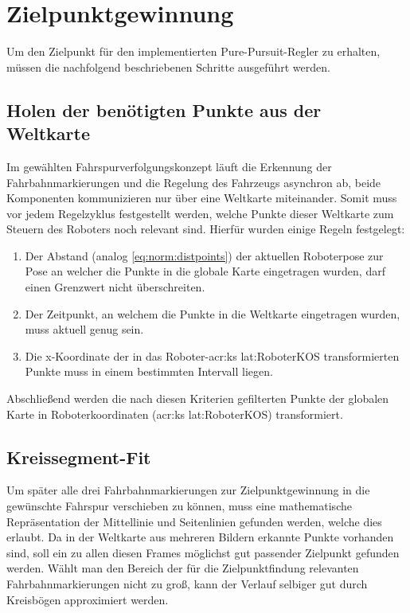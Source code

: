 \section{Zielpunktgewinnung}
Um den Zielpunkt für den implementierten \glqq Pure-Pursuit\grqq -Regler zu erhalten, müssen die nachfolgend beschriebenen Schritte ausgeführt werden.

\subsection{Holen der benötigten Punkte aus der Weltkarte}
Im gewählten Fahrspurverfolgungskonzept läuft die Erkennung der Fahrbahnmarkierungen und die Regelung des Fahrzeugs asynchron ab, beide Komponenten kommunizieren nur über eine Weltkarte miteinander. Somit muss vor jedem Regelzyklus festgestellt werden, welche Punkte dieser Weltkarte zum Steuern des Roboters noch relevant sind. Hierfür wurden einige Regeln festgelegt:
\begin{enumerate}
\item 
Der Abstand (analog \ref{eq:norm:distpoints}) der aktuellen Roboterpose zur Pose an welcher die Punkte in die globale Karte eingetragen wurden, darf einen Grenzwert nicht überschreiten.
\item
Der Zeitpunkt, an welchem die Punkte in die Weltkarte eingetragen wurden, muss aktuell genug sein.
\item
Die x-Koordinate der in das Roboter-\gls{acr:ks} \gls{lat:RoboterKOS} transformierten Punkte muss in einem bestimmten Intervall liegen.
\end{enumerate}
Abschließend werden die nach diesen Kriterien gefilterten Punkte der globalen Karte in Roboterkoordinaten (\gls{acr:ks} \gls{lat:RoboterKOS}) transformiert.

\subsection{Kreissegment-Fit} \label{regelung:zielpunkt:kreissegment-fit}
Um später alle drei Fahrbahnmarkierungen zur Zielpunktgewinnung in die gewünschte Fahrspur verschieben zu können, muss eine mathematische Repräsentation der Mittellinie und Seitenlinien gefunden werden, welche dies erlaubt. Da in der Weltkarte aus mehreren Bildern erkannte Punkte vorhanden sind, soll ein zu allen diesen Frames möglichst gut passender Zielpunkt gefunden werden. Wählt man den Bereich der für die Zielpunktfindung relevanten Fahrbahnmarkierungen nicht zu groß, kann der Verlauf selbiger gut durch Kreisbögen approximiert werden. 

